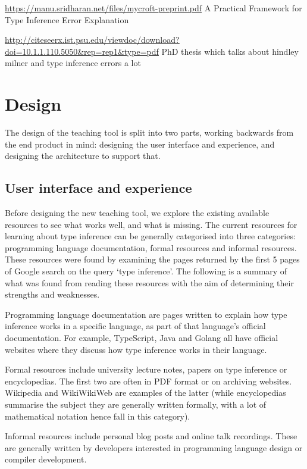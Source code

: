 \documentclass[a4paper,fleqn,twoside,12pt]{report}
\begin{document}
\underline{\href{https://manu.sridharan.net/files/mycroft-preprint.pdf}{https://manu.sridharan.net/files/mycroft-preprint.pdf}}
A Practical Framework for Type Inference Error Explanation

\underline{\href{http://citeseerx.ist.psu.edu/viewdoc/download?doi=10.1.1.110.5050\&rep=rep1\&type=pdf}{http://citeseerx.ist.psu.edu/viewdoc/download?doi=10.1.1.110.5050\&rep=rep1\&type=pdf}}
PhD thesis which talks about hindley milner and type inference errors a lot
\chapter{Design}\label{id:h.7ggvdxb04tzm}
The design of the teaching tool is split into two parts, working backwards from the end product in mind: designing the user interface and experience, and designing the architecture to support that.
\section{User interface and experience}\label{id:h.dr046u473e01}
Before designing the new teaching tool, we explore the existing available resources to see what works well, and what is missing. The current resources for learning about type inference can be generally categorised into three categories: programming language documentation, formal resources and informal resources. These resources were found by examining the pages returned by the first 5 pages of Google search on the query ‘type inference’. The following is a summary of what was found from reading these resources with the aim of determining their strengths and weaknesses.

Programming language documentation are pages written to explain how type inference works in a specific language, as part of that language’s official documentation. For example, TypeScript, Java and Golang all have official websites where they discuss how type inference works in their language.

Formal resources include university lecture notes, papers on type inference or encyclopedias. The first two are often in PDF format or on archiving websites. Wikipedia and WikiWikiWeb are examples of the latter (while encyclopedias summarise the subject they are generally written formally, with a lot of mathematical notation hence fall in this category).

Informal resources include personal blog posts and online talk recordings. These are generally written by developers interested in programming language design or compiler development.
\end{document}
